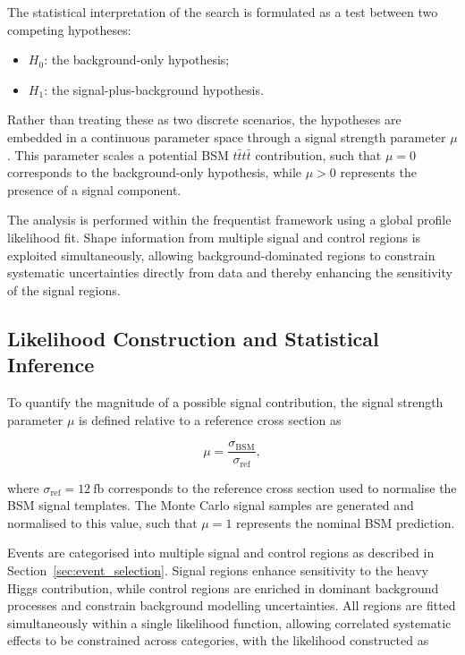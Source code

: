 ﻿The statistical interpretation of the search is formulated as a test between two competing hypotheses:

\begin{itemize}
    \item $H_0$: the background-only hypothesis;
    \item $H_1$: the signal-plus-background hypothesis.
\end{itemize}

Rather than treating these as two discrete scenarios, the hypotheses are embedded in a continuous parameter space through a signal strength parameter $\mu$. 
This parameter scales a potential BSM $t\bar{t}t\bar{t}$ contribution, such that $\mu = 0$ corresponds to the background-only hypothesis, while $\mu > 0$ represents the presence of a signal component.

The analysis is performed within the frequentist framework using a global profile likelihood fit. 
Shape information from multiple signal and control regions is exploited simultaneously, allowing background-dominated regions to constrain systematic uncertainties directly from data and thereby enhancing the sensitivity of the signal regions.

\subsection{Likelihood Construction and Statistical Inference}
\label{sec:likelihood_construction}

To quantify the magnitude of a possible signal contribution, 
the signal strength parameter $\mu$ is defined relative to a reference cross section as

\begin{equation}
\mu = \frac{\sigma_{\mathrm{BSM}}}{\sigma_{\mathrm{ref}}},
\end{equation}

where $\sigma_{\mathrm{ref}} = 12~\mathrm{fb}$ corresponds to the reference cross section used to normalise the BSM signal templates. 
The Monte Carlo signal samples are generated and normalised to this value, such that $\mu = 1$ represents the nominal BSM prediction.

Events are categorised into multiple signal and control regions as described in Section~\ref{sec:event_selection}. 
Signal regions enhance sensitivity to the heavy Higgs contribution, while control regions are enriched in dominant background processes and constrain background modelling uncertainties. 
All regions are fitted simultaneously within a single likelihood function, allowing correlated systematic effects to be constrained across categories, 
with the likelihood constructed as

